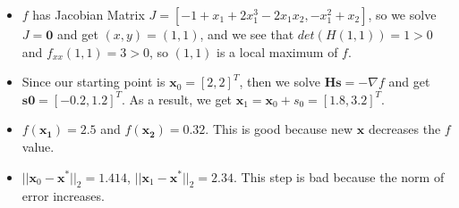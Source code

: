 \documentclass[11pt]{article}
\begin{document}
	\begin{itemize}
		\item $f$ has Jacobian Matrix $J = [-1 + x_1 + 2x_1^3 -2x_1x_2, -x_1^2 + x_2]$, so we solve $J = \mathbf{0}$ and get $(x, y) = (1, 1)$, and we see that $det(H(1, 1)) = 1 > 0$ and $f_{xx}(1, 1) = 3 > 0$, so $(1, 1)$ is a local maximum of $f$.
		\item Since our starting point is $\mathbf{x}_0 = [2, 2]^T$, then we solve $\mathbf{Hs} = -\nabla f$ and get $\mathbf{s0} = [-0.2, 1.2]^T$. As a result, we get $\mathbf{x}_1 = \mathbf{x}_0 + s_0 = [1.8, 3.2]^T$.
		\item $f(\mathbf{x_1}) = 2.5$ and $f(\mathbf{x_2}) = 0.32$. This is good because new $\mathbf{x}$ decreases the $f$ value.
		\item $||\mathbf{x}_0 - \mathbf{x}^*||_2 = 1.414$, $||\mathbf{x}_1 - \mathbf{x}^*||_2 = 2.34$. This step is bad because the norm of error increases.
	\end{itemize}
\end{document}
